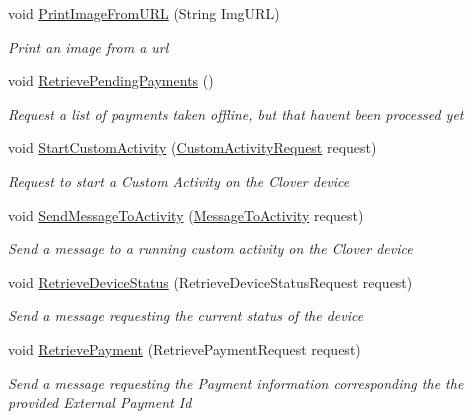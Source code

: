 \begin{DoxyCompactItemize}
void \hyperlink{interfacecom_1_1clover_1_1remotepay_1_1sdk_1_1_i_clover_connector_a16ffe34012c788351332d1d2c41be602}{Print\+Image\+From\+U\+RL} (String Img\+U\+RL)
\begin{DoxyCompactList}\small\item\em Print an image from a url \end{DoxyCompactList}\item 
void \hyperlink{interfacecom_1_1clover_1_1remotepay_1_1sdk_1_1_i_clover_connector_a5d371f91336d4950e32ff051061ad91d}{Retrieve\+Pending\+Payments} ()
\begin{DoxyCompactList}\small\item\em Request a list of payments taken offline, but that haven\textquotesingle{}t been processed yet \end{DoxyCompactList}\item 
void \hyperlink{interfacecom_1_1clover_1_1remotepay_1_1sdk_1_1_i_clover_connector_a3ec58f5860c34bcb104578caddb0b564}{Start\+Custom\+Activity} (\hyperlink{classcom_1_1clover_1_1remotepay_1_1sdk_1_1_custom_activity_request}{Custom\+Activity\+Request} request)
\begin{DoxyCompactList}\small\item\em Request to start a Custom Activity on the Clover device \end{DoxyCompactList}\item 
void \hyperlink{interfacecom_1_1clover_1_1remotepay_1_1sdk_1_1_i_clover_connector_ad6e241f6dac22bafa5edcc89457c99a7}{Send\+Message\+To\+Activity} (\hyperlink{classcom_1_1clover_1_1remotepay_1_1sdk_1_1_message_to_activity}{Message\+To\+Activity} request)
\begin{DoxyCompactList}\small\item\em Send a message to a running custom activity on the Clover device \end{DoxyCompactList}\item 
void \hyperlink{interfacecom_1_1clover_1_1remotepay_1_1sdk_1_1_i_clover_connector_a172b1a191a58f1f0e4dcc0a8dc7eae48}{Retrieve\+Device\+Status} (Retrieve\+Device\+Status\+Request request)
\begin{DoxyCompactList}\small\item\em Send a message requesting the current status of the device \end{DoxyCompactList}\item 
void \hyperlink{interfacecom_1_1clover_1_1remotepay_1_1sdk_1_1_i_clover_connector_a3b85cfdb92b7c64d9b27decc49ca8b7c}{Retrieve\+Payment} (Retrieve\+Payment\+Request request)
\begin{DoxyCompactList}\small\item\em Send a message requesting the Payment information corresponding the the provided External Payment Id \end{DoxyCompactList}\end{DoxyCompactItemize}


